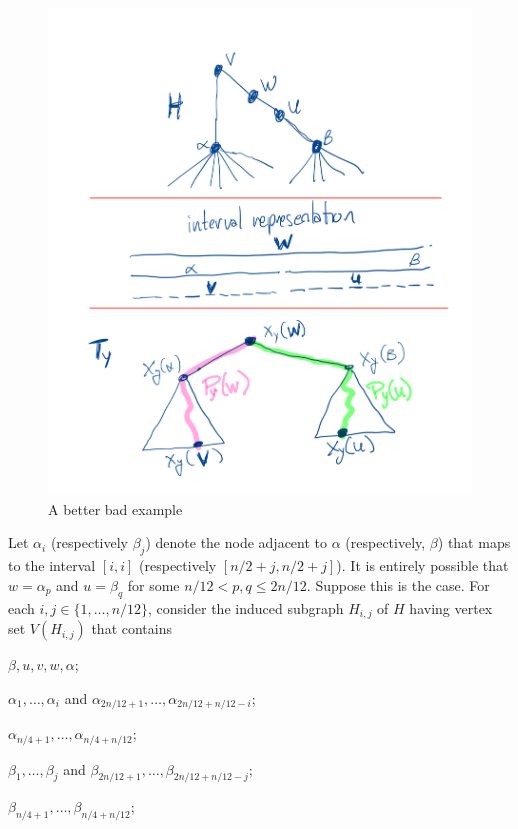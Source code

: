 \documentclass{patmorin}
\begin{document}
\begin{figure}
    \begin{center}
        \includegraphics{figs/bad-example}
    \end{center}
    \caption{A better bad example}
    \label{bad-example}
\end{figure}

Let $\alpha_i$ (respectively $\beta_j$) denote the node adjacent to $\alpha$ (respectively, $\beta$) that maps to the interval $[i,i]$ (respectively $[n/2+j,n/2+j]$).  It is entirely possible that $w=\alpha_p$ and $u=\beta_q$ for some $n/12< p,q\le 2n/12$.  Suppose this is the case.  For each $i,j\in\{1,\ldots,n/12\}$, consider the induced subgraph $H_{i,j}$ of $H$ having vertex set $V(H_{i,j})$ that contains
\begin{compactenum}
    \item $\beta,u,v,w,\alpha$;
    \item $\alpha_1,\ldots,\alpha_i$ and $\alpha_{2n/12+1},\ldots,\alpha_{2n/12+n/12-i}$;
    \item $\alpha_{n/4+1},\ldots,\alpha_{n/4+n/12}$;
    \item $\beta_1,\ldots,\beta_j$ and $\beta_{2n/12+1},\ldots,\beta_{2n/12+n/12-j}$;
    \item $\beta_{n/4+1},\ldots,\beta_{n/4+n/12}$;
\end{compactenum}
\end{document}
